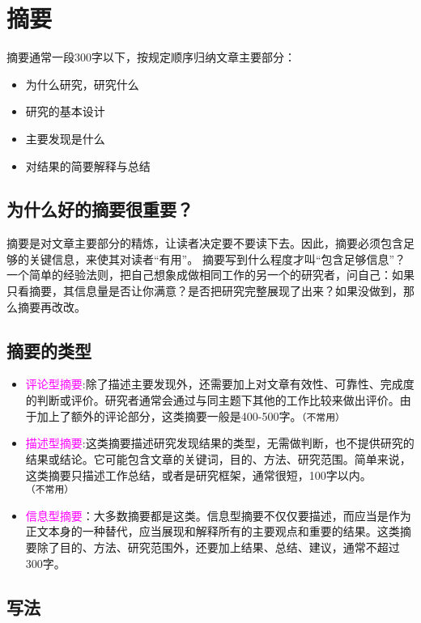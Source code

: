 \documentclass[cn,hazy,blue,14pt,screen]{elegantnote} %
\begin{document}
\section{摘要}

摘要通常一段300字以下，按规定顺序归纳文章主要部分：

\begin{itemize}
  \item 为什么研究，研究什么
  \item 研究的基本设计
  \item 主要发现是什么
  \item 对结果的简要解释与总结
\end{itemize}

\subsection{为什么好的摘要很重要？}

摘要是对文章主要部分的精炼，让读者决定要不要读下去。因此，摘要必须包含足够的关键信息，来使其对读者“有用”。
摘要写到什么程度才叫“包含足够信息”？一个简单的经验法则，把自己想象成做相同工作的另一个的研究者，问自己：如果只看摘要，其信息量是否让你满意？是否把研究完整展现了出来？如果没做到，那么摘要再改改。

\subsection{摘要的类型}

\begin{itemize}
  \item \textcolor{magenta}{评论型摘要}:除了描述主要发现外，还需要加上对文章有效性、可靠性、完成度的判断或评价。研究者通常会通过与同主题下其他的工作比较来做出评价。由于加上了额外的评论部分，这类摘要一般是400-500字。\lstinline{（不常用）}
  \item \textcolor{magenta}{描述型摘要}:这类摘要描述研究发现结果的类型，无需做判断，也不提供研究的结果或结论。它可能包含文章的关键词，目的、方法、研究范围。简单来说，这类摘要只描述工作总结，或者是研究框架，通常很短，100字以内。\lstinline{（不常用）}
  \item \textcolor{magenta}{信息型摘要}：大多数摘要都是这类。信息型摘要不仅仅要描述，而应当是作为正文本身的一种替代，应当展现和解释所有的主要观点和重要的结果。这类摘要除了目的、方法、研究范围外，还要加上结果、总结、建议，通常不超过300字。
\end{itemize}

\subsection{写法}
\end{document}
